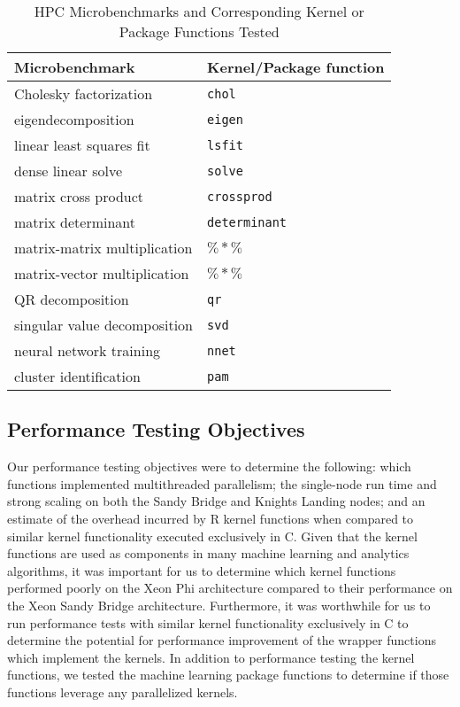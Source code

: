 \begin{table*}
  \caption{HPC Microbenchmarks and Corresponding Kernel or Package Functions Tested}
  \label{tab:microbenchmarks}
  \begin{tabular}{ll}
    \toprule
    Microbenchmark & Kernel/Package function \\
   \midrule
    Cholesky factorization       & \texttt{chol} \\
    eigendecomposition           & \texttt{eigen} \\
    linear least squares fit     & \texttt{lsfit} \\
    dense linear solve           & \texttt{solve} \\
    matrix cross product         & \texttt{crossprod} \\
    matrix determinant           & \texttt{determinant} \\
    matrix-matrix multiplication & $\%*\%$ \\
    matrix-vector multiplication & $\%*\%$ \\
    QR decomposition             & \texttt{qr} \\
    singular value decomposition & \texttt{svd} \\
    neural network training      & \texttt{nnet} \\
    cluster identification       & \texttt{pam} \\
    \bottomrule
  \end{tabular}
\end{table*}

\subsection{Performance Testing Objectives}
Our performance testing objectives were to determine the following: which
  functions implemented multithreaded parallelism; the single-node
  run time and strong scaling on both the Sandy Bridge and Knights
  Landing nodes; and an estimate of the overhead incurred by R kernel functions
  when compared to similar kernel functionality executed exclusively in C.
Given that the kernel functions are used as components in many machine learning
  and analytics algorithms, it was important for us to determine which kernel
  functions performed poorly on the Xeon Phi architecture compared to their
  performance on the Xeon Sandy Bridge architecture.
Furthermore, it was worthwhile for us to run performance tests with
  similar kernel functionality exclusively in C to determine the potential
  for performance improvement of the wrapper functions which implement the
  kernels.
In addition to performance testing the kernel functions, we tested the machine
  learning package functions to determine if those functions leverage any
  parallelized kernels.

